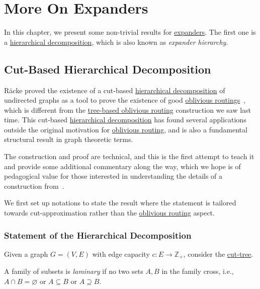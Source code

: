 \chapter{More On Expanders}
In this chapter, we present some non-trivial results for \hyperref[def:expander]{expanders}. The first one is a \hyperref[def:hierarchical-decopmposition]{hierarchical decomposition}, which is also known as \emph{expander hierarchy}.

\section{Cut-Based Hierarchical Decomposition}
Räcke proved the existence of a cut-based \hyperref[def:hierarchical-decomposition]{hierarchical decomposition} of undirected graphs as a tool to prove the existence of good \hyperref[prb:oblivious-routing]{oblivious routings}~\cite{racke2002minimizing}, which is different from the \hyperref[not:tree-based-oblivious-routing]{tree-based oblivious routing} construction we saw last time. This cut-based \hyperref[def:hierarchical-decomposition]{hierarchical decomposition} has found several applications outside the original motivation for \hyperref[prb:oblivious-routing]{oblivious routing}, and is also a fundamental structural result in graph theoretic terms.

\begin{note}
	The construction and proof are technical, and this is the first attempt to teach it and provide some additional commentary along the way, which we hope is of pedagogical value for those interested in understanding the details of a construction from~\cite{bienkowski2003practical}.
\end{note}

We first set up notations to state the result where the statement is tailored towards cut-approximation rather than the \hyperref[prb:oblivious-routing]{oblivious routing} aspect.

\subsection{Statement of the Hierarchical Decomposition}
Given a graph \(G = (V, E)\) with edge capacity \(c \colon E \to \mathbb{Z} _+\), consider the \hyperref[def:cut-tree]{cut-tree}.

\begin{definition}[Laminary]\label{def:laminary}
	A family of subsets is \emph{laminary} if no two sets \(A, B\) in the family cross, i.e., \(A \cap B = \varnothing \) or \(A \subseteq B\) or \(A \supseteq B\).
\end{definition}


